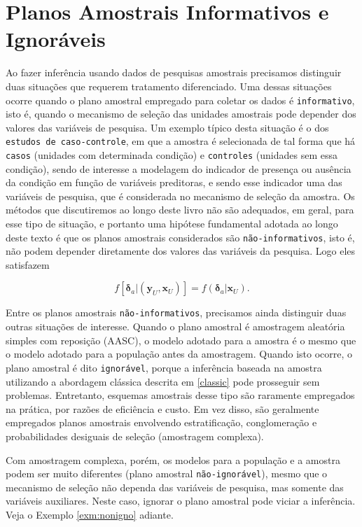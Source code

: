 \documentclass[]{book}
\theoremstyle{definition}
\theoremstyle{definition}
\theoremstyle{definition}
\theoremstyle{remark}
\begin{document}
\section{Planos Amostrais Informativos e Ignoráveis}\label{inform}

Ao fazer inferência usando dados de pesquisas amostrais precisamos
distinguir duas situações que requerem tratamento diferenciado. Uma
dessas situações ocorre quando o plano amostral empregado para coletar
os dados é \texttt{informativo}, isto é, quando o mecanismo de seleção
das unidades amostrais pode depender dos valores das variáveis de
pesquisa. Um exemplo típico desta situação é o dos
\texttt{estudos\ de\ caso-controle}, em que a amostra é selecionada de
tal forma que há \texttt{casos} (unidades com determinada condição) e
\texttt{controles} (unidades sem essa condição), sendo de interesse a
modelagem do indicador de presença ou ausência da condição em função de
variáveis preditoras, e sendo esse indicador uma das variáveis de
pesquisa, que é considerada no mecanismo de seleção da amostra. Os
métodos que discutiremos ao longo deste livro não são adequados, em
geral, para esse tipo de situação, e portanto uma hipótese fundamental
adotada ao longo deste texto é que os planos amostrais considerados são
\texttt{não-informativos}, isto é, não podem depender diretamente dos
valores das variáveis da pesquisa. Logo eles satisfazem

\begin{equation}
f\left[ \mathbf{\delta }_a | \left( \mathbf{y}_U , \mathbf{x}_U \right)
\right] = f\left( \mathbf{\delta }_a | \mathbf{x}_U \right) . \label{eq:ref7}
\end{equation}

Entre os planos amostrais \texttt{não-informativos}, precisamos ainda
distinguir duas outras situações de interesse. Quando o plano amostral é
amostragem aleatória simples com reposição (AASC), o modelo adotado para
a amostra é o mesmo que o modelo adotado para a população antes da
amostragem. Quando isto ocorre, o plano amostral é dito
\texttt{ignorável}, porque a inferência baseada na amostra utilizando a
abordagem clássica descrita em \ref{classic} pode prosseguir sem
problemas. Entretanto, esquemas amostrais desse tipo são raramente
empregados na prática, por razões de eficiência e custo. Em vez disso,
são geralmente empregados planos amostrais envolvendo estratificação,
conglomeração e probabilidades desiguais de seleção (amostragem
complexa).

Com amostragem complexa, porém, os modelos para a população e a amostra
podem ser muito diferentes (plano amostral \texttt{não-ignorável}),
mesmo que o mecanismo de seleção não dependa das variáveis de pesquisa,
mas somente das variáveis auxiliares. Neste caso, ignorar o plano
amostral pode viciar a inferência. Veja o Exemplo \ref{exm:nonigno}
adiante.
\end{document}
